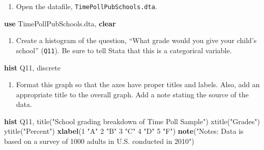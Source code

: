 \documentclass[
]{book}
\newenvironment{Shaded}{\begin{snugshade}}{\end{snugshade}}
\newcommand{\BaseNTok}[1]{\textcolor[rgb]{0.00,0.00,0.81}{#1}}
\newcommand{\KeywordTok}[1]{\textcolor[rgb]{0.13,0.29,0.53}{\textbf{#1}}}
\newcommand{\NormalTok}[1]{#1}
\newcommand{\StringTok}[1]{\textcolor[rgb]{0.31,0.60,0.02}{#1}}
\providecommand{\tightlist}{%
  \setlength{\itemsep}{0pt}\setlength{\parskip}{0pt}}
\begin{document}
\begin{enumerate}
\def\labelenumi{\arabic{enumi}.}
\setcounter{enumi}{5}
\tightlist
\item
  Open the datafile, \texttt{TimePollPubSchools.dta}.
\end{enumerate}

\begin{Shaded}
\begin{Highlighting}[]
\KeywordTok{use}\NormalTok{ TimePollPubSchools.dta, }\KeywordTok{clear}
\end{Highlighting}
\end{Shaded}

\begin{enumerate}
\def\labelenumi{\arabic{enumi}.}
\setcounter{enumi}{6}
\tightlist
\item
  Create a histogram of the question, ``What grade would you give your child's school'' (\texttt{Q11}). Be sure to tell Stata that this is a categorical variable.
\end{enumerate}

\begin{Shaded}
\begin{Highlighting}[]
\KeywordTok{hist}\NormalTok{ Q11, discrete}
\end{Highlighting}
\end{Shaded}

\begin{enumerate}
\def\labelenumi{\arabic{enumi}.}
\setcounter{enumi}{7}
\tightlist
\item
  Format this graph so that the axes have proper titles and labels. Also, add an appropriate title to the overall graph. Add a note stating the source of the data.
\end{enumerate}

\begin{Shaded}
\begin{Highlighting}[]
\KeywordTok{hist}\NormalTok{ Q11, }\BaseNTok{title}\NormalTok{(}\StringTok{"School grading breakdown of Time Poll Sample"}\NormalTok{) }\BaseNTok{xtitle}\NormalTok{(}\StringTok{"Grades"}\NormalTok{) }\BaseNTok{ytitle}\NormalTok{(}\StringTok{"Percent"}\NormalTok{) }\KeywordTok{xlabel}\NormalTok{(1 }\StringTok{"A"}\NormalTok{ 2 }\StringTok{"B"}\NormalTok{ 3 }\StringTok{"C"}\NormalTok{ 4 }\StringTok{"D"}\NormalTok{ 5 }\StringTok{"F"}\NormalTok{) }\KeywordTok{note}\NormalTok{(}\StringTok{"Notes: Data is based on a survey of 1000 adults in U.S. conducted in 2010"}\NormalTok{)}
\end{Highlighting}
\end{Shaded}
\end{document}
